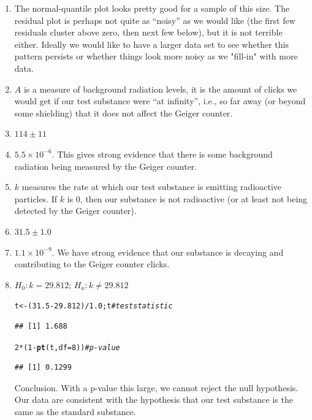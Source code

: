 \documentclass[twoside]{book}\usepackage[]{graphicx}\usepackage[]{xcolor}
\makeatletter
\newcommand{\hlnum}[1]{\textcolor[rgb]{0.686,0.059,0.569}{#1}}%
\newcommand{\hlcom}[1]{\textcolor[rgb]{0.678,0.584,0.686}{\textit{#1}}}%
\newcommand{\hlopt}[1]{\textcolor[rgb]{0,0,0}{#1}}%
\newcommand{\hlstd}[1]{\textcolor[rgb]{0.345,0.345,0.345}{#1}}%
\newcommand{\hlkwb}[1]{\textcolor[rgb]{0.69,0.353,0.396}{#1}}%
\newcommand{\hlkwc}[1]{\textcolor[rgb]{0.333,0.667,0.333}{#1}}%
\newcommand{\hlkwd}[1]{\textcolor[rgb]{0.737,0.353,0.396}{\textbf{#1}}}%
\newenvironment{kframe}{%
 \def\at@end@of@kframe{}%
 \ifinner\ifhmode%
  \def\at@end@of@kframe{\end{minipage}}%
  \begin{minipage}{\columnwidth}%
 \fi\fi%
 \def\FrameCommand##1{\hskip\@totalleftmargin \hskip-\fboxsep
 \colorbox{shadecolor}{##1}\hskip-\fboxsep
     \hskip-\linewidth \hskip-\@totalleftmargin \hskip\columnwidth}%
 \MakeFramed {\advance\hsize-\width
   \@totalleftmargin\z@ \linewidth\hsize
   \@setminipage}}%
 {\par\unskip\endMakeFramed%
 \at@end@of@kframe}
\newenvironment{knitrout}{}{} %
\makeatother
\begin{document}
\begin{solution}
	\begin{enumerate}
			\item
				The normal-quantile plot looks pretty good for a sample of this size.
				The residual plot is perhaps not quite as ``noisy'' as we would like 
				(the first few residuals cluster above zero, then next few below), but it 
				is not terrible either. Ideally we would like to have a larger 
				data set to see whether this pattern persists or whether things look more
				noisy as we "fill-in" with more data.
			\item
				$A$ is a measure of background radiation levels, it is the amount of clicks 
				we would get if our test substance were ``at infinity'', i.e., so far away (or 
				beyond some shielding) that it does not affect the Geiger counter.
			\item
				$114 \pm 11$
			\item
				\ensuremath{5.5\times 10^{-6}}.  This gives strong evidence that there is some background radiation
				being measured by the Geiger counter.
			\item
				$k$ measures the rate at which our test substance is emitting radioactive 
				particles.  If $k$ is 0, then our substance is not radioactive (or at least not
				being detected by the Geiger counter).
			\item
				$31.5  \pm 1.0$
			\item
				\ensuremath{1.1\times 10^{-9}}.  We have strong evidence that our substance is decaying and 
				contributing to the Geiger counter clicks.
			\item
				$H_0: k = 29.812$;  $H_a: k \neq 29.812$
\begin{knitrout}
\color{fgcolor}\begin{kframe}
\begin{alltt}
\hlstd{t} \hlkwb{<-} \hlstd{(}\hlnum{31.5} \hlopt{-} \hlnum{29.812}\hlstd{)} \hlopt{/} \hlnum{1.0}\hlstd{; t}     \hlcom{# test statistic}
\end{alltt}
\begin{verbatim}
## [1] 1.688
\end{verbatim}
\begin{alltt}
\hlnum{2} \hlopt{*} \hlstd{(}\hlnum{1} \hlopt{-} \hlkwd{pt}\hlstd{(t,} \hlkwc{df} \hlstd{=} \hlnum{8}\hlstd{))}           \hlcom{# p -value}
\end{alltt}
\begin{verbatim}
## [1] 0.1299
\end{verbatim}
\end{kframe}
\end{knitrout}
				Conclusion.  With a p-value this large, we cannot reject the null hypothesis.
				Our data are consistent with the hypothesis that our test substance is the same
				as the standard substance.
	\end{enumerate}
\end{solution}
\end{document}
